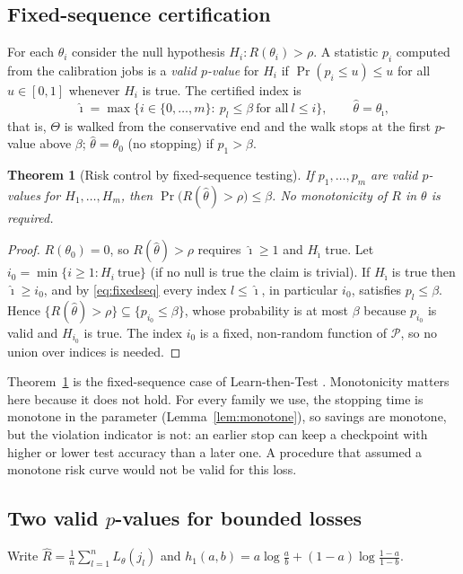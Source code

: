 \documentclass[3p,twocolumn,10pt]{elsarticle}
\newtheorem{theorem}{Theorem}
\theoremstyle{definition}
\begin{document}
\subsection{Fixed-sequence certification}
For each $\theta_i$ consider the null hypothesis $H_i:R(\theta_i)>\rho$. A statistic $p_i$ computed from the calibration jobs is a \emph{valid $p$-value} for $H_i$ if $\Pr(p_i\le u)\le u$ for all $u\in[0,1]$ whenever $H_i$ is true. The certified index is
\begin{equation}
\hat\imath=\max\{i\in\{0,\dots,m\}:\ p_l\le\beta\ \text{for all}\ l\le i\},\qquad \hat\theta=\theta_{\hat\imath},
\label{eq:fixedseq}
\end{equation}
that is, $\Theta$ is walked from the conservative end and the walk stops at the first $p$-value above $\beta$; $\hat\theta=\theta_0$ (no stopping) if $p_1>\beta$.

\begin{theorem}[Risk control by fixed-sequence testing]
\label{prop:risk}
If $p_1,\dots,p_m$ are valid $p$-values for $H_1,\dots,H_m$, then $\Pr\big(R(\hat\theta)>\rho\big)\le\beta$. No monotonicity of $R$ in $\theta$ is required.
\end{theorem}
\begin{proof}
$R(\theta_0)=0$, so $R(\hat\theta)>\rho$ requires $\hat\imath\ge1$ and $H_{\hat\imath}$ true. Let $i_0=\min\{i\ge1: H_i\ \text{true}\}$ (if no null is true the claim is trivial). If $H_{\hat\imath}$ is true then $\hat\imath\ge i_0$, and by \eqref{eq:fixedseq} every index $l\le\hat\imath$, in particular $i_0$, satisfies $p_l\le\beta$. Hence $\{R(\hat\theta)>\rho\}\subseteq\{p_{i_0}\le\beta\}$, whose probability is at most $\beta$ because $p_{i_0}$ is valid and $H_{i_0}$ is true. The index $i_0$ is a fixed, non-random function of $\mathcal{P}$, so no union over indices is needed.
\end{proof}

\noindent Theorem~\ref{prop:risk} is the fixed-sequence case of Learn-then-Test \citep{angelopoulos2025ltt}. Monotonicity matters here because it does not hold. For every family we use, the stopping time is monotone in the parameter (Lemma~\ref{lem:monotone}), so savings are monotone, but the violation indicator is not: an earlier stop can keep a checkpoint with higher or lower test accuracy than a later one. A procedure that assumed a monotone risk curve would not be valid for this loss.

\subsection{Two valid $p$-values for bounded losses}
Write $\hat R=\frac1n\sum_{l=1}^{n}L_\theta(j_l)$ and $h_1(a,b)=a\log\frac ab+(1-a)\log\frac{1-a}{1-b}$.
\end{document}
